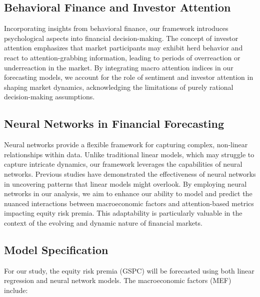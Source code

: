 \documentclass{article}
\begin{document}
\subsection{Behavioral Finance and Investor Attention}

Incorporating insights from behavioral finance, our framework introduces psychological aspects into financial decision-making. The concept of investor attention emphasizes that market participants may exhibit herd behavior and react to attention-grabbing information, leading to periods of overreaction or underreaction in the market. By integrating macro attention indices in our forecasting models, we account for the role of sentiment and investor attention in shaping market dynamics, acknowledging the limitations of purely rational decision-making assumptions.

\subsection{Neural Networks in Financial Forecasting}

Neural networks provide a flexible framework for capturing complex, non-linear relationships within data. Unlike traditional linear models, which may struggle to capture intricate dynamics, our framework leverages the capabilities of neural networks. Previous studies have demonstrated the effectiveness of neural networks in uncovering patterns that linear models might overlook. By employing neural networks in our analysis, we aim to enhance our ability to model and predict the nuanced interactions between macroeconomic factors and attention-based metrics impacting equity risk premia. This adaptability is particularly valuable in the context of the evolving and dynamic nature of financial markets.

\subsection{Model Specification}

For our study, the equity risk premia (GSPC) will be forecasted using both linear regression and neural network models. The macroeconomic factors (MEF) include:
\end{document}
